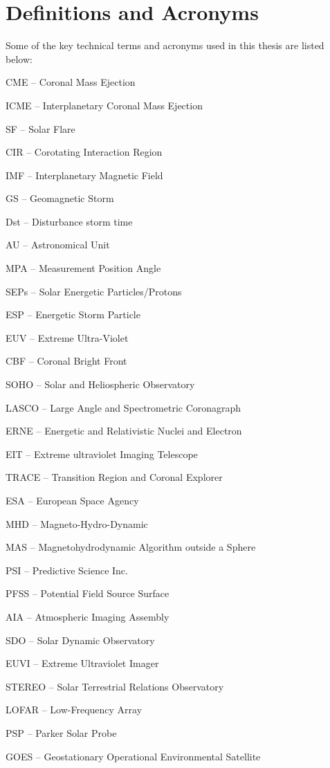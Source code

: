 \section{Definitions and Acronyms}
Some of the key technical terms and acronyms used in this thesis are listed below:

CME -- Coronal Mass Ejection

ICME -- Interplanetary Coronal Mass Ejection

SF -- Solar Flare

CIR -- Corotating Interaction Region

IMF -- Interplanetary Magnetic Field

GS -- Geomagnetic Storm

Dst -- Disturbance storm time

AU -- Astronomical Unit

MPA -- Measurement Position Angle

SEPs -- Solar Energetic Particles/Protons

ESP -- Energetic Storm Particle

EUV -- Extreme Ultra-Violet

CBF -- Coronal Bright Front

SOHO -- Solar and Heliospheric Observatory

LASCO -- Large Angle and Spectrometric Coronagraph

ERNE -- Energetic and Relativistic Nuclei and Electron

EIT -- Extreme ultraviolet Imaging Telescope

TRACE -- Transition Region and Coronal Explorer

ESA -- European Space Agency

MHD -- Magneto-Hydro-Dynamic

MAS -- Magnetohydrodynamic Algorithm outside a Sphere

PSI -- Predictive Science Inc.

PFSS -- Potential Field Source Surface

AIA -- Atmospheric Imaging Assembly

SDO -- Solar Dynamic Observatory

EUVI -- Extreme Ultraviolet Imager

STEREO -- Solar Terrestrial Relations Observatory

LOFAR -- Low-Frequency Array

PSP -- Parker Solar Probe

GOES -- Geostationary Operational Environmental Satellite

